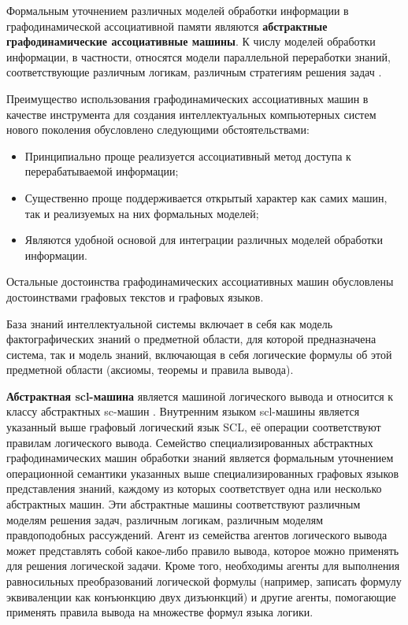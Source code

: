 Формальным уточнением различных моделей обработки информации в графодинамической ассоциативной памяти являются \textbf{абстрактные графодинамические ассоциативные машины}. К числу моделей обработки информации, в частности, относятся модели параллельной переработки знаний, соответствующие различным логикам, различным стратегиям решения задач \cite{sc_machines}. 

Преимущество использования графодинамических ассоциативных машин в качестве инструмента для создания интеллектуальных компьютерных систем нового поколения обусловлено следующими обстоятельствами:

\begin{itemize}
	\item{Принципиально проще реализуется ассоциативный метод доступа к перерабатываемой
		информации;}
	\item{Существенно проще поддерживается открытый характер как самих машин, так и реализуемых на них формальных моделей;}
	\item{Являются удобной основой для интеграции различных моделей обработки информации.}
\end{itemize}

Остальные достоинства графодинамических ассоциативных машин обусловлены достоинствами графовых текстов и графовых языков.

База знаний интеллектуальной системы включает в себя как модель фактографических знаний о предметной области, для которой предназначена система, так и модель знаний, включающая в себя логические формулы об этой предметной области (аксиомы, теоремы и правила вывода).

\textbf{Абстрактная scl-машина} является машиной логического вывода и относится к классу абстрактных sc-машин \cite{scl}. Внутренним языком scl-машины является указанный выше графовый логический язык SCL, её операции соответствуют правилам логического вывода. Семейство специализированных абстрактных графодинамических машин обработки знаний является формальным уточнением операционной семантики указанных выше специализированных графовых языков представления знаний, каждому из которых соответствует одна или несколько абстрактных машин. Эти абстрактные машины соответствуют различным моделям решения задач, различным логикам, различным моделям правдоподобных рассуждений. 
Агент из семейства агентов логического вывода может представлять собой какое-либо правило вывода, которое можно применять для решения логической задачи. Кроме того, необходимы агенты для выполнения равносильных преобразований логической формулы (например, записать формулу эквиваленции как конъюнкцию двух дизъюнкций) и другие агенты, помогающие применять правила вывода на множестве формул языка логики.

